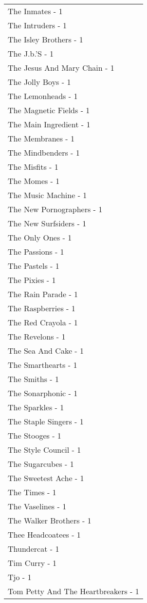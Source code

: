 \documentclass[
]{article}
\begin{document}
\begin{longtable}{l}
The Inmates - 1 \\ 
The Intruders - 1 \\ 
The Isley Brothers - 1 \\ 
The J.b.'S - 1 \\ 
The Jesus And Mary Chain - 1 \\ 
The Jolly Boys - 1 \\ 
The Lemonheads - 1 \\ 
The Magnetic Fields - 1 \\ 
The Main Ingredient - 1 \\ 
The Membranes - 1 \\ 
The Mindbenders - 1 \\ 
The Misfits - 1 \\ 
The Momes - 1 \\ 
The Music Machine - 1 \\ 
The New Pornographers - 1 \\ 
The New Surfsiders - 1 \\ 
The Only Ones - 1 \\ 
The Passions - 1 \\ 
The Pastels - 1 \\ 
The Pixies - 1 \\ 
The Rain Parade - 1 \\ 
The Raspberries - 1 \\ 
The Red Crayola - 1 \\ 
The Revelons - 1 \\ 
The Sea And Cake - 1 \\ 
The Smarthearts - 1 \\ 
The Smiths - 1 \\ 
The Sonarphonic - 1 \\ 
The Sparkles - 1 \\ 
The Staple Singers - 1 \\ 
The Stooges - 1 \\ 
The Style Council - 1 \\ 
The Sugarcubes - 1 \\ 
The Sweetest Ache - 1 \\ 
The Times - 1 \\ 
The Vaselines - 1 \\ 
The Walker Brothers - 1 \\ 
Thee Headcoatees - 1 \\ 
Thundercat - 1 \\ 
Tim Curry - 1 \\ 
Tjo - 1 \\ 
Tom Petty And The Heartbreakers - 1 \\ 

\end{longtable}
\end{document}
